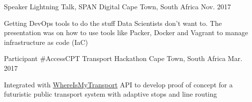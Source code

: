 \begin{cventries}
  \cventry
    {Speaker} %
    {Lightning Talk, SPAN Digital} %
    {Cape Town, South Africa} %
    {Nov. 2017} %
    {
      \begin{cvitems} %
        \item {Getting DevOps tools to do the stuff Data Scientists don’t want to. The presentation was on how to use tools like Packer, Docker and Vagrant to manage infrastructure as code (IaC)}
      \end{cvitems}
    }

  \cventry
    {Participant} %
    {\#AccessCPT Transport Hackathon} %
    {Cape Town, South Africa} %
    {Mar. 2017} %
    {
      \begin{cvitems} %
        \item {Integrated with \href{https://www.whereismytransport.com}{WhereIsMyTransport} API to develop proof of concept for a futuristic public transport system with adaptive stops and line routing}
      \end{cvitems}
    }

\end{cventries}
